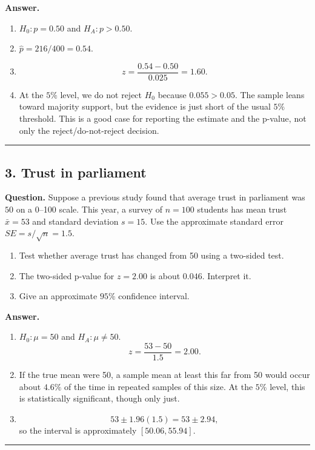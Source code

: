 \documentclass[12pt]{article}
\begin{document}
\noindent
\textbf{Answer.}
\begin{enumerate}[label=(\alph*)]
\item $H_0: p = 0.50$ and $H_A: p > 0.50$.
\item $\hat{p}=216/400=0.54$.
\item
\[
z=\frac{0.54-0.50}{0.025}=1.60.
\]
\item At the $5\%$ level, we do not reject $H_0$ because $0.055>0.05$. The sample leans toward majority support, but the evidence is just short of the usual $5\%$ threshold. This is a good case for reporting the estimate and the p-value, not only the reject/do-not-reject decision.
\end{enumerate}

\hrule

\subsection*{3. Trust in parliament}

\noindent
\textbf{Question.}
Suppose a previous study found that average trust in parliament was $50$ on a 0--100 scale. This year, a survey of $n=100$ students has mean trust $\bar{x}=53$ and standard deviation $s=15$. Use the approximate standard error $SE=s/\sqrt{n}=1.5$.

\begin{enumerate}[label=(\alph*)]
\item Test whether average trust has changed from 50 using a two-sided test.
\item The two-sided p-value for $z=2.00$ is about $0.046$. Interpret it.
\item Give an approximate $95\%$ confidence interval.
\end{enumerate}

\noindent
\textbf{Answer.}
\begin{enumerate}[label=(\alph*)]
\item $H_0:\mu=50$ and $H_A:\mu\ne 50$.
\[
z=\frac{53-50}{1.5}=2.00.
\]
\item If the true mean were 50, a sample mean at least this far from 50 would occur about $4.6\%$ of the time in repeated samples of this size. At the $5\%$ level, this is statistically significant, though only just.
\item
\[
53 \pm 1.96(1.5)=53\pm 2.94,
\]
so the interval is approximately $[50.06,55.94]$.
\end{enumerate}

\hrule
\end{document}
